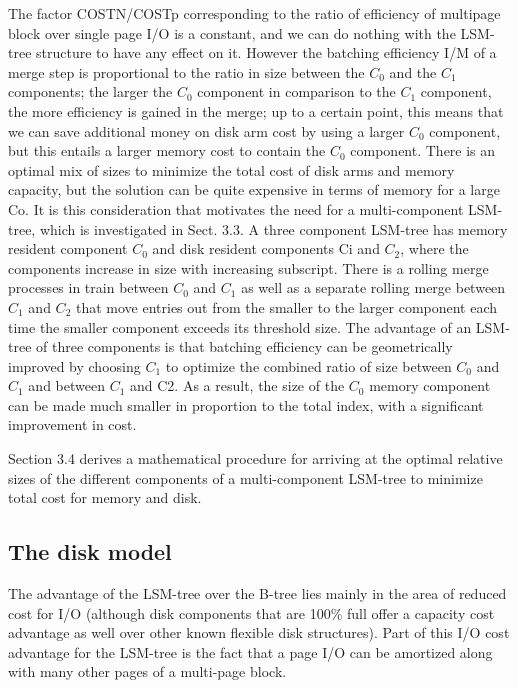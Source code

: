 \documentclass[a4paper,12pt,notitlepage,twoside,openright]{article}
\begin{document}
The factor COSTN/COSTp corresponding to the ratio of efficiency of
multipage block over single page I/O is a constant, and we can do
nothing with the LSM-tree structure to have any effect on it. However
the batching efficiency I/M of a merge step is proportional to the ratio
in size between the \(C_0\) and the \(C_1\) components; the larger the \(C_0\)
component in comparison to the \(C_1\) component, the more efficiency is gained
in the merge; up to a certain point, this means that we can save
additional money on disk arm cost by using a larger \(C_0\) component, but
this entails a larger memory cost to contain the \(C_0\) component. There is
an optimal mix of sizes to minimize the total cost of disk arms and
memory capacity, but the solution can be quite expensive in terms of
memory for a large Co. It is this consideration that motivates the need
for a multi-component LSM-tree, which is investigated in Sect. 3.3. A
three component LSM-tree has memory resident component \(C_0\) and disk
resident components Ci and \(C_2\), where the components increase in size
with increasing subscript. There is a rolling merge processes in train
between \(C_0\) and \(C_1\) as well as a separate rolling merge between \(C_1\) and \(C_2\)
that move entries out from the smaller to the larger component each time
the smaller component exceeds its threshold size. The advantage of an
LSM-tree of three components is that batching efficiency can be
geometrically improved by choosing \(C_1\) to optimize the combined ratio of
size between \(C_0\) and \(C_1\) and between \(C_1\) and C2. As a result, the size of
the \(C_0\) memory component can be made much smaller in proportion to the
total index, with a significant improvement in cost.

Section 3.4 derives a mathematical procedure for arriving at the optimal
relative sizes of the different components of a multi-component LSM-tree
to minimize total cost for memory and disk.


\hypertarget{the-disk-model}{%
\subsection{The disk model}\label{the-disk-model}}


The advantage of the LSM-tree over the B-tree lies mainly in the area of
reduced cost for I/O (although disk components that are 100\% full offer
a capacity cost advantage as well over other known flexible disk
structures). Part of this I/O cost advantage for the LSM-tree is the
fact that a page I/O can be amortized along with many other pages of a
multi-page block.
\end{document}
